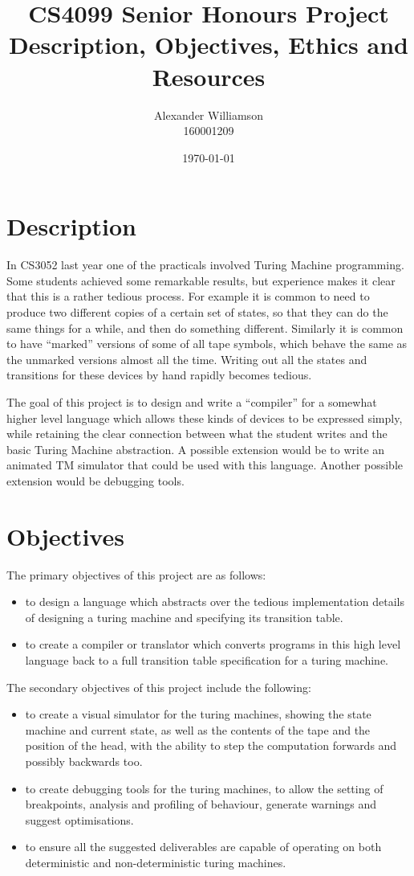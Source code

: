 \documentclass[11pt]{report}
\title{CS4099 Senior Honours Project\\Description, Objectives, Ethics and Resources}
\author{Alexander Williamson\\160001209}
\date{\today}
\begin{document}
    \maketitle
    \newpage
    \section*{Description}

    In CS3052 last year one of the practicals involved Turing Machine programming. Some students achieved some remarkable results, but experience makes it clear that this is a rather tedious process. For example it is common to need to produce two different copies of a certain set of states, so that they can do the same things for a while, and then do something different. Similarly it is common to have “marked” versions of some of all tape symbols, which behave the same as the unmarked versions almost all the time. Writing out all the states and transitions for these devices by hand rapidly becomes tedious.

    The goal of this project is to design and write a “compiler” for a somewhat higher level language which allows these kinds of devices to be expressed simply, while retaining the clear connection between what the student writes and the basic Turing Machine abstraction.   A possible extension would be to write an animated TM simulator that could be used with this language. Another possible extension would be debugging tools.

    \section*{Objectives}

    The primary objectives of this project are as follows:
    \begin{itemize}     
        \item to design a language which abstracts over the tedious implementation details of designing a turing machine and specifying its transition table.
        \item to create a compiler or translator which converts programs in this high level language back to a full transition table specification for a turing machine.
    \end{itemize}
    \newpage
    The secondary objectives of this project include the following:
    \begin{itemize}
        \item to create a visual simulator for the turing machines, showing the state machine and current state, as well as the contents of the tape and the position of the head, with the ability to step the computation forwards and possibly backwards too.
        \item to create debugging tools for the turing machines, to allow the setting of breakpoints, analysis and profiling of behaviour, generate warnings and suggest optimisations.
        \item to ensure all the suggested deliverables are capable of operating on both deterministic and non-deterministic turing machines.
    \end{itemize}
\end{document}
